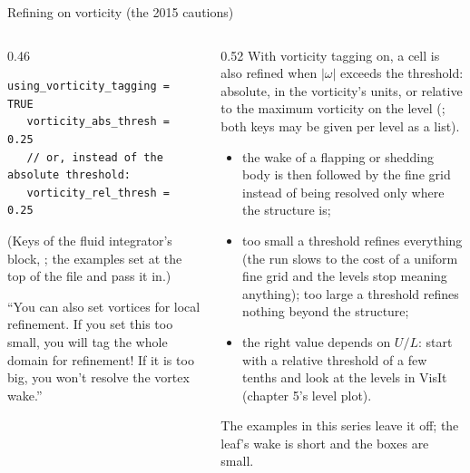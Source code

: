 \documentclass[aspectratio=169,11pt]{beamer}
\begin{document}
\begin{frame}[fragile]{Refining on vorticity (the 2015 cautions)}
\label{fr:vort}
\begin{columns}[T,onlytextwidth]
\begin{column}{0.46\textwidth}
\begin{lstlisting}[style=inputtiny]
   using_vorticity_tagging = TRUE
   vorticity_abs_thresh = 0.25
   // or, instead of the absolute threshold:
   vorticity_rel_thresh = 0.25
\end{lstlisting}
\footnotesize (Keys of the fluid integrator's block, ; the examples set  at the top of the file and pass it in.)
\vspace{1mm}

\footnotesize ``You can also set vortices for local refinement. If you set this too small, you will tag the whole domain for refinement! If it is too big, you won't resolve the vortex wake.''
\end{column}
\begin{column}{0.52\textwidth}
\footnotesize With vorticity tagging on, a cell is also refined when $|\omega|$ exceeds the threshold: absolute, in the vorticity's units, or relative to the maximum vorticity on the level (; both keys may be given per level as a list).
\begin{itemize}
  \item the wake of a flapping or shedding body is then followed by the fine grid instead of being resolved only where the structure is;
  \item too small a threshold refines everything (the run slows to the cost of a uniform fine grid and the levels stop meaning anything); too large a threshold refines nothing beyond the structure;
  \item the right value depends on $U/L$: start with a relative threshold of a few tenths and look at the levels in VisIt (chapter 5's level plot).
\end{itemize}
\footnotesize The examples in this series leave it off; the leaf's wake is short and the boxes are small.
\end{column}
\end{columns}
\end{frame}
\end{document}
